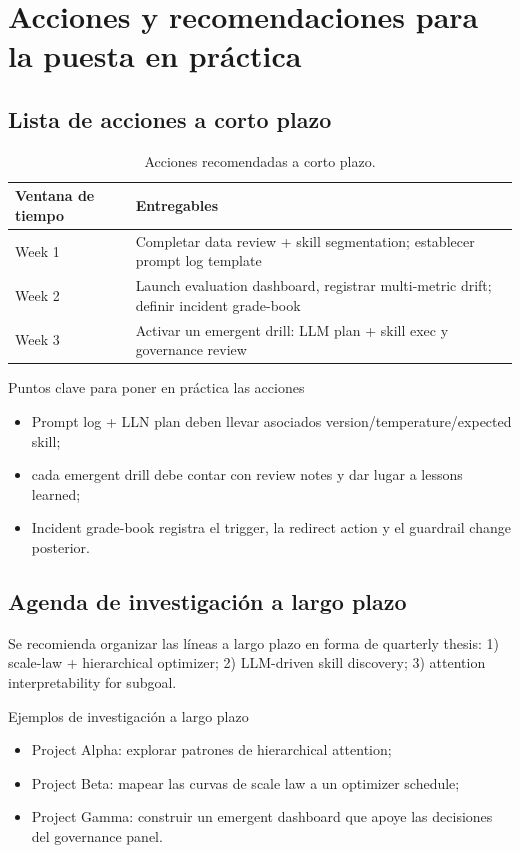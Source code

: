 \section{Acciones y recomendaciones para la puesta en práctica}

\subsection{Lista de acciones a corto plazo}

\begin{table}[H]
\centering
\begin{tabular}{p{3cm}p{6cm}}
\toprule
Ventana de tiempo & Entregables \\
\midrule
Week 1 & Completar data review + skill segmentation; establecer prompt log template \\
Week 2 & Launch evaluation dashboard, registrar multi-metric drift; definir incident grade-book \\
Week 3 & Activar un emergent drill: LLM plan + skill exec y governance review \\
\bottomrule
\end{tabular}
\caption{Acciones recomendadas a corto plazo.}
\end{table}

\begin{importantbox}{Puntos clave para poner en práctica las acciones}
\begin{itemize}
    \item Prompt log + LLN plan deben llevar asociados version/temperature/expected skill;
    \item cada emergent drill debe contar con review notes y dar lugar a lessons learned;
    \item Incident grade-book registra el trigger, la redirect action y el guardrail change posterior.
\end{itemize}
\end{importantbox}

\subsection{Agenda de investigación a largo plazo}

Se recomienda organizar las líneas a largo plazo en forma de quarterly thesis: 1) scale-law + hierarchical optimizer; 2) LLM-driven skill discovery; 3) attention interpretability for subgoal.

\begin{knowledgebox}{Ejemplos de investigación a largo plazo}
\begin{itemize}
    \item Project Alpha: explorar patrones de hierarchical attention;
    \item Project Beta: mapear las curvas de scale law a un optimizer schedule;
    \item Project Gamma: construir un emergent dashboard que apoye las decisiones del governance panel.
\end{itemize}
\end{knowledgebox}

